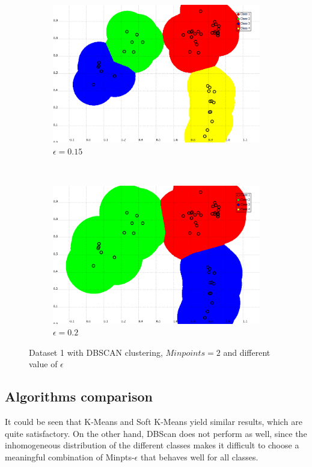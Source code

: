 \documentclass[a4paper,10pt]{article}
\begin{document}
\begin{figure}[H]
\begin{subfigure}[t]{0.2\textwidth}
      \includegraphics[width=\textwidth]{pictures/DBSCAN-Minpoint-2-epsilon015}
      \caption{$\epsilon = 0.15$}
      \label{fig:DBSCAN-Minpoint-2-epsilon15}
     \end{subfigure}
      ~
    \begin{subfigure}[t]{0.2\textwidth}
      \centering
      \includegraphics[width=\textwidth]{pictures/DBSCAN-Minpoint-2-epsilon02}
      \caption{$\epsilon = 0.2$}
      \label{fig:DBSCAN-Minpoint-2-epsilon02}
     \end{subfigure}
     \caption{Dataset 1 with DBSCAN clustering, $Minpoints = 2 $ and different value of $\epsilon$}
     \label{fig:DBScan_varyeps}
\end{figure}

\subsection{Algorithms comparison}
It could be seen that K-Means and Soft K-Means yield similar results, which are quite satisfactory. On the other hand, DBScan does not perform as well, since the inhomogeneous distribution of the different classes makes it difficult to choose a meaningful combination of Minpts-$\epsilon$ that behaves well for all classes. 
\end{document}
